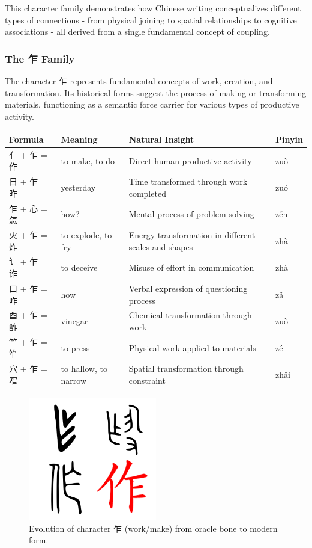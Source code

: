 \documentclass[11pt,letterpaper]{article}
\begin{document}
This character family demonstrates how Chinese writing conceptualizes
different types of connections - from physical joining to spatial
relationships to cognitive associations - all derived from a single
fundamental concept of coupling.

\subsubsection{The 乍 Family}\label{the-ux4e4d-family}

The character 乍 represents fundamental concepts of work, creation, and
transformation. Its historical forms suggest the process of making or
transforming materials, functioning as a semantic force carrier for
various types of productive activity.

\begin{longtable}{|p{3cm}|p{3cm}|p{6cm}|p{2cm}|}
\hline
\textbf{Formula} & \textbf{Meaning} & \textbf{Natural Insight} & \textbf{Pinyin} \\
\hline
亻 + 乍 = 作 & to make, to do & Direct human productive activity & zuò \\
\hline
日 + 乍 = 昨 & yesterday & Time transformed through work completed &
zuó \\
\hline
乍 + 心 = 怎 & how? & Mental process of problem-solving & zěn \\
\hline
火 + 乍 = 炸 & to explode, to fry & Energy transformation in different
scales and shapes & zhà \\
\hline
讠 + 乍 = 诈 & to deceive & Misuse of effort in communication & zhà \\
\hline
口 + 乍 = 咋 & how  & Verbal expression of questioning process & zǎ \\
\hline
酉 + 乍 = 酢 & vinegar & Chemical transformation through work & zuò \\
\hline
⺮ + 乍 = 笮 & to press & Physical work applied to materials & zé \\
\hline
穴 + 乍 = 窄 & to hallow, to narrow & Spatial transformation through constraint &
zhǎi \\
\hline
\end{longtable}

\begin{figure}
\centering
\includegraphics[width=0.5\textwidth]{./images/zi_work.png}
\caption{Evolution of character 乍 (work/make) from oracle bone to
modern form.}
\end{figure}
\end{document}
